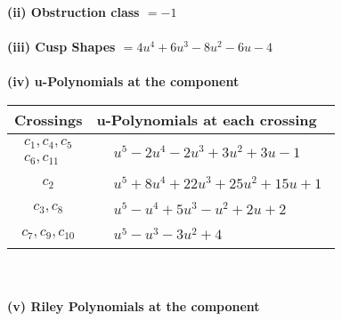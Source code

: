 \documentclass[1p]{elsarticle_modified}
\theoremstyle{definition}
\begin{document}
\flushleft \textbf{(ii) Obstruction class $= -1$}\\~\\
\flushleft \textbf{(iii) Cusp Shapes $= 4 u^4+6 u^3-8 u^2-6 u-4$}\\~\\
\newpage\renewcommand{\arraystretch}{1}
\flushleft \textbf{(iv) u-Polynomials at the component}\newline \\
\begin{tabular}{m{50pt}|m{274pt}}
Crossings & \hspace{64pt}u-Polynomials at each crossing \\
\hline $$\begin{aligned}c_{1},c_{4},c_{5}\\c_{6},c_{11}\end{aligned}$$&$\begin{aligned}
&u^5-2 u^4-2 u^3+3 u^2+3 u-1
\end{aligned}$\\
\hline $$\begin{aligned}c_{2}\end{aligned}$$&$\begin{aligned}
&u^5+8 u^4+22 u^3+25 u^2+15 u+1
\end{aligned}$\\
\hline $$\begin{aligned}c_{3},c_{8}\end{aligned}$$&$\begin{aligned}
&u^5- u^4+5 u^3- u^2+2 u+2
\end{aligned}$\\
\hline $$\begin{aligned}c_{7},c_{9},c_{10}\end{aligned}$$&$\begin{aligned}
&u^5- u^3-3 u^2+4
\end{aligned}$\\
\hline
\end{tabular}\\~\\
\newpage\renewcommand{\arraystretch}{1}
\flushleft \textbf{(v) Riley Polynomials at the component}\newline \\
\end{document}

